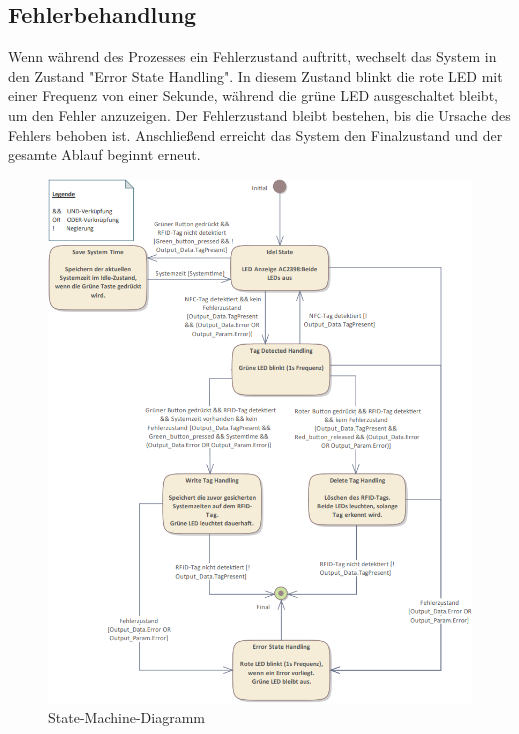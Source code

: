 \subsection*{Fehlerbehandlung}
\label{subsec:Fehlerbehandlung}

Wenn während des Prozesses ein Fehlerzustand auftritt, wechselt das System in den Zustand "Error State Handling". In diesem Zustand blinkt die rote LED mit einer Frequenz von einer Sekunde, während die grüne LED ausgeschaltet bleibt, um den Fehler anzuzeigen. Der Fehlerzustand bleibt bestehen, bis die Ursache des Fehlers behoben ist. Anschließend erreicht das System den Finalzustand und der gesamte Ablauf beginnt erneut.
\begin{figure}[h!]
	\centering
	\includegraphics[width=1.0\textwidth]{images/StateMachine.png}
	\vspace{1cm}
	\caption{State-Machine-Diagramm}
	\label{fig:StateMachineDiagramm}
\end{figure}

